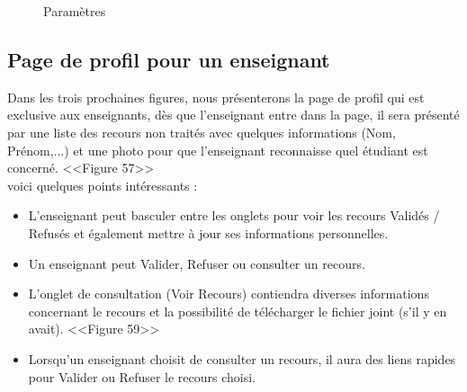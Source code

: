 \documentclass[12pt]{report}
\begin{document}
\begin{figure}[h]
\centering
\caption{Paramètres}
\end{figure}

\newpage

\vspace*{-0.6in}
\subsection{Page de profil pour un enseignant}

Dans les trois prochaines figures, nous présenterons la page de profil qui est exclusive aux enseignants, dès que l'enseignant entre dans la page, il sera présenté par une liste des recours non traités avec quelques informations (Nom, Prénom,...) et une photo pour que l'enseignant reconnaisse quel étudiant est concerné. <<Figure 57>>
\\
voici quelques points intéressants :

\vspace{-0.05in}
\begin{itemize}
  \item L'enseignant peut basculer entre les onglets pour voir les recours Validés / Refusés et également mettre à jour ses informations personnelles.
  \item Un enseignant peut Valider, Refuser ou consulter un recours.
  \item L'onglet de consultation (Voir Recours) contiendra diverses informations concernant le recours et la possibilité de télécharger le fichier joint (s'il y en avait). <<Figure 59>>
  \item Lorsqu'un enseignant choisit de consulter un recours, il aura des liens rapides pour Valider ou Refuser le recours choisi.
\end{itemize}
\end{document}
